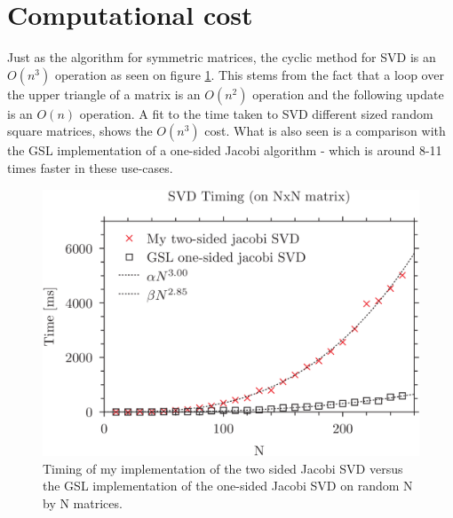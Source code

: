 \documentclass{article}
\begin{document}
    \section{Computational cost}
    Just as the algorithm for symmetric matrices, the cyclic method for SVD is an $ O(n^3) $ operation as seen on figure \ref{fig:timing}. This stems from the fact that a loop over the upper triangle of a matrix is an $ O(n^2) $ operation and the following update is an $ O(n) $ operation. A fit to the time taken to SVD different sized random square matrices, shows the $ O(n^3) $ cost.
    What is also seen is a comparison with the GSL implementation of a one-sided Jacobi algorithm - which is around 8-11 times faster in these use-cases.
    \begin{figure}
    	\includegraphics{timing.png}
    	\caption{Timing of my implementation of the two sided Jacobi SVD versus the GSL implementation of the one-sided Jacobi SVD on random N by N matrices.}
    	\label{fig:timing}
    \end{figure}
    
    
    
\end{document}

